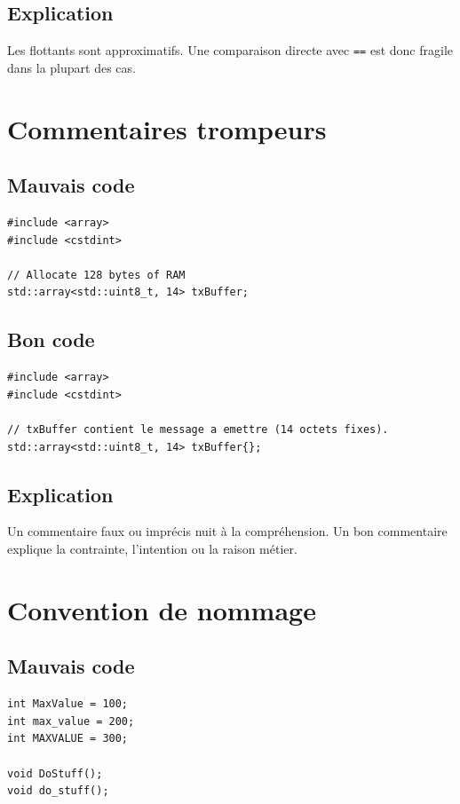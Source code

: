 \documentclass[a4paper,11pt]{report}
\begin{document}
\section{Explication}
Les flottants sont approximatifs.
Une comparaison directe avec \texttt{==} est donc fragile dans la plupart des cas.

\chapter{Commentaires trompeurs}

\section{Mauvais code}
\begin{lstlisting}
#include <array>
#include <cstdint>

// Allocate 128 bytes of RAM
std::array<std::uint8_t, 14> txBuffer;
\end{lstlisting}

\section{Bon code}
\begin{lstlisting}
#include <array>
#include <cstdint>

// txBuffer contient le message a emettre (14 octets fixes).
std::array<std::uint8_t, 14> txBuffer{};
\end{lstlisting}

\section{Explication}
Un commentaire faux ou imprécis nuit à la compréhension.
Un bon commentaire explique la contrainte, l'intention ou la raison métier.

\chapter{Convention de nommage}

\section{Mauvais code}
\begin{lstlisting}
int MaxValue = 100;
int max_value = 200;
int MAXVALUE = 300;

void DoStuff();
void do_stuff();
\end{lstlisting}
\end{document}
